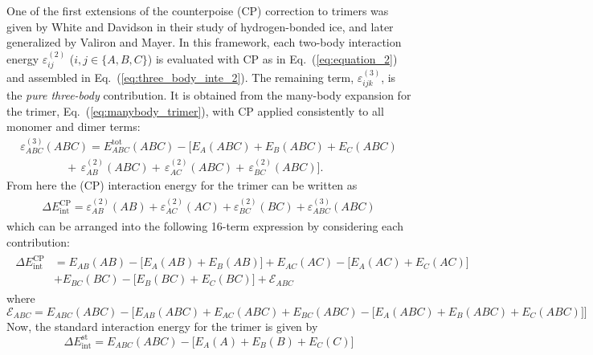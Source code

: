 One of the first extensions of the counterpoise (CP) correction to trimers was given by White and Davidson in their study of hydrogen-bonded ice\autocite{White1990}, and later generalized by Valiron and Mayer\autocite{Valiron1997}. In this framework, each two-body interaction energy $\varepsilon_{ij}^{(2)}$ ($i,j\in\{A,B,C\}$) is evaluated with CP as in Eq.~(\ref{eq:equation_2}) and assembled in Eq.~(\ref{eq:three_body_inte_2}). The remaining term,
$\varepsilon_{ijk}^{(3)}$, is the \emph{pure three-body} contribution. It is obtained from the many-body expansion for the trimer, Eq.~(\ref{eq:manybody_trimer}), with CP applied consistently to all monomer and dimer terms:
{\small
\begin{equation}
\label{eq:three_body_cp}
\begin{split}
\varepsilon_{ABC}^{(3)}(ABC)
= E^{\mathrm{tot}}_{ABC}(ABC)
- \Big[
  E_{A}(ABC) + E_{B}(ABC) + E_{C}(ABC)
  \\
  \qquad\qquad
  +\, \varepsilon_{AB}^{(2)}(ABC)
  +\, \varepsilon_{AC}^{(2)}(ABC)
  +\, \varepsilon_{BC}^{(2)}(ABC)
\Big].
\end{split}
\end{equation}
}
From here the (CP) interaction energy for the trimer can be written as
\begin{align}
    \begin{split}
        \Delta E_{\text{int}}^{\text{CP}} =
        \varepsilon_{AB}^{(2)}(AB) + \varepsilon_{AC}^{(2)}(AC) + \varepsilon_{BC}^{(2)}(BC) + \varepsilon_{ABC}^{(3)}(ABC)
    \end{split}
\end{align}
which can be arranged into the following 16-term expression by considering each contribution:
{\small
\begin{align}
    \begin{split}
        \Delta E_{\text{int}}^{\text{CP}} &=
        E_{AB}(AB) - \big[E_{A}(AB)+E_{B}(AB)\big] + E_{AC}(AC) -\big[E_{A}(AC)+E_{C}(AC)\big]\\
        &+  E_{BC}(BC)
        -\big[E_{B}(BC)+E_{C}(BC)\big]
        + \mathcal{E}_{ABC}
        \label{eq:equation-11}
    \end{split}
\end{align}
}
where 
\[
\mathcal{E}_{ABC} =  E_{ABC}(ABC) - \big[E_{AB}(ABC) + E_{AC}(ABC) + E_{BC}(ABC) - \big[E_{A}(ABC) + E_{B}(ABC)+E_{C}(ABC)\big]\big]
\]
\clearpage
Now, the standard interaction energy  for the trimer is given by
\begin{equation}
    \Delta E_{\text{int}}^{\text{st}} = E_{ABC}(ABC) - \big[ 
    E_{A}(A) + E_{B}(B) + E_{C}(C)\big]
    \label{eq:equation-12}
\end{equation}
